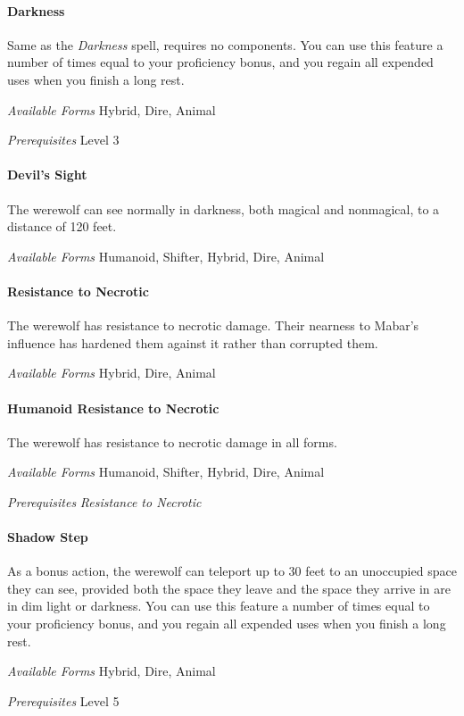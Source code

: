 \documentclass[twocolumn]{dndbook}
\begin{document}
\paragraph*{Darkness}
Same as the \emph{Darkness} spell, requires no components.
You can use this feature a number of times equal to your proficiency bonus, and you regain all expended uses when you finish a long rest.\par
\emph{Available Forms} Hybrid, Dire, Animal\par
\emph{Prerequisites} Level 3\par

\paragraph*{Devil's Sight}
The werewolf can see normally in darkness, both magical and nonmagical, to a distance of 120 feet.\par
\emph{Available Forms} Humanoid, Shifter, Hybrid, Dire, Animal\par

\paragraph*{Resistance to Necrotic}
The werewolf has resistance to necrotic damage.
Their nearness to Mabar's influence has hardened them against it rather than corrupted them.\par
\emph{Available Forms} Hybrid, Dire, Animal\par

\paragraph*{Humanoid Resistance to Necrotic}
The werewolf has resistance to necrotic damage in all forms.\par
\emph{Available Forms} Humanoid, Shifter, Hybrid, Dire, Animal\par
\emph{Prerequisites} \emph{Resistance to Necrotic}\par

\paragraph*{Shadow Step}
As a bonus action, the werewolf can teleport up to 30 feet to an unoccupied space they can see, provided both the space they leave and the space they arrive in are in dim light or darkness.
You can use this feature a number of times equal to your proficiency bonus, and you regain all expended uses when you finish a long rest.\par
\emph{Available Forms} Hybrid, Dire, Animal\par
\emph{Prerequisites} Level 5\par
\end{document}

